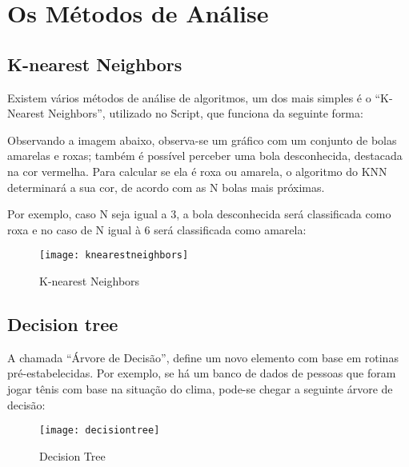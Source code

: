 \chapter{Os Métodos de Análise}
\label{chapter:os_metodos_de_analise}

\section{\textbf{K-nearest Neighbors}}

Existem vários métodos de análise de algoritmos, um dos mais simples é o “K-Nearest Neighbors”, utilizado no Script, que funciona da seguinte forma:

Observando a imagem abaixo, observa-se um gráfico com um conjunto de bolas amarelas e roxas; também é possível perceber uma bola desconhecida, destacada na cor vermelha. Para calcular se ela é roxa ou amarela, o algoritmo do KNN determinará a sua cor, de acordo com as N bolas mais próximas.

Por exemplo, caso N seja igual a 3, a bola desconhecida será classificada como roxa e no caso de N igual à 6 será classificada como amarela:

\begin{figure}[!htb]
\begin{center}
\caption{K-nearest Neighbors}
\texttt{[image: knearestneighbors]}
\end{center}
\cite{KNN}
\end{figure}




\section{\textbf{Decision tree}}

A chamada “Árvore de Decisão”, define um novo elemento com base em rotinas pré-estabelecidas. Por exemplo, se há um banco de dados de pessoas que foram jogar tênis com base na situação do clima, pode-se chegar a seguinte árvore de decisão:


\begin{figure}[!htb]
\begin{center}
\caption{Decision Tree}
\texttt{[image: decisiontree]}
\end{center}
\cite{ARVOREDECISAO}
\end{figure}

